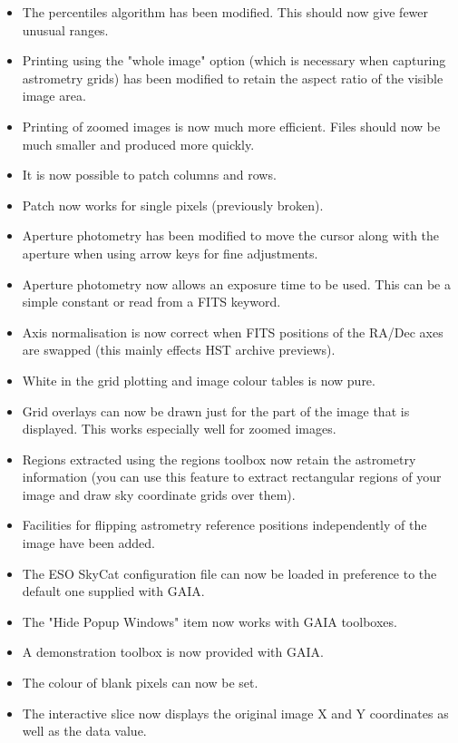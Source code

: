 \documentclass[twoside,11pt]{article}
\renewcommand{\_}{\texttt{\symbol{95}}}
\begin{document}
\begin{itemize}
    \item The percentiles algorithm has been modified. This should now
      give fewer unusual ranges.

    \item Printing using the "whole image" option (which is necessary
      when capturing astrometry grids) has been modified to retain
      the aspect ratio of the visible image area.

    \item Printing of zoomed images is now much more efficient. Files
      should now be much smaller and produced more quickly.

    \item It is now possible to patch columns and rows.

    \item Patch now works for single pixels (previously broken).

    \item Aperture photometry has been modified to move the cursor along
      with the aperture when using arrow keys for fine adjustments.

    \item Aperture photometry now allows an exposure time to be used. This
      can be a simple constant or read from a FITS keyword.

    \item Axis normalisation is now correct when FITS positions of the
      RA/Dec axes are swapped (this mainly effects HST archive previews).

    \item White in the grid plotting and image colour tables is now pure.

    \item Grid overlays can now be drawn just for the part of the image
      that is displayed. This works especially well for zoomed images.

    \item Regions extracted using the regions toolbox now retain the
      astrometry information (you can use this feature to extract
      rectangular regions of your image and draw sky coordinate grids
      over them).

    \item Facilities for flipping astrometry reference positions
      independently of the image have been added.

    \item The ESO SkyCat configuration file can now be loaded in
      preference to the default one supplied with GAIA.

    \item The "Hide Popup Windows" item now works with GAIA toolboxes.

    \item A demonstration toolbox is now provided with GAIA.

    \item The colour of blank pixels can now be set.

    \item The interactive slice now displays the original image X and Y
      coordinates as well as the data value.

\end{itemize}
\end{document}
